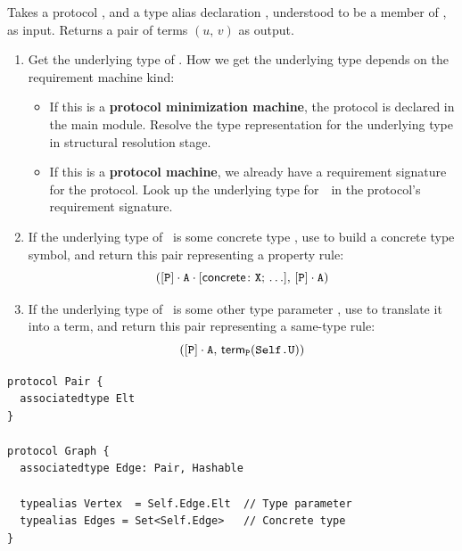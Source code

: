 \documentclass[../generics]{subfiles}
\begin{document}
\begin{algorithm}\label{build rule alias}
Takes a protocol \tP, and a type alias declaration \nA, understood to be a member of \tP, as input. Returns a pair of terms $(u,\,v)$ as output.
\begin{enumerate}
\item Get the underlying type of \nA. How we get the underlying type depends on the requirement machine kind:
\begin{itemize}
\item If this is a \textbf{protocol minimization machine}, the protocol is declared in the main module. Resolve the type representation for the underlying type in structural resolution stage.

\item If this is a \textbf{protocol machine}, we already have a requirement signature for the protocol. Look up the underlying type for~\nA\ in the protocol's requirement signature.
\end{itemize}
\item If the underlying type of \nA\ is some concrete type \tX, use  to build a concrete type symbol, and return this pair representing a property rule:
\[([\texttt{P}] \cdot \texttt{A} \cdot [\mathsf{concrete}\colon \texttt{X};\,\ldots],\, [\texttt{P}] \cdot \texttt{A})\]
\item If the underlying type of \nA\ is some other type parameter \SelfU, use  to translate it into a term, and return this pair representing a same-type rule:
\[([\texttt{P}] \cdot \texttt{A},\, \mathsf{term}_{\texttt{P}}(\texttt{Self.U}))\]
\end{enumerate}
\end{algorithm}

\newcommand{\pPair}{\protosym{Pair}}
\newcommand{\pGraph}{\protosym{Graph}}
\newcommand{\nEl}{\texttt{Elt}}
\newcommand{\nEd}{\texttt{Edge}}
\newcommand{\nV}{\texttt{Vertex}}
\newcommand{\nES}{\texttt{Edges}}

\newcommand{\aEl}{\assocsym{Pair}{Elt}}
\newcommand{\aEd}{\assocsym{Graph}{Edge}}

\begin{listing}\label{listing:graph proto}
\begin{Verbatim}
protocol Pair {
  associatedtype Elt
}

protocol Graph {
  associatedtype Edge: Pair, Hashable

  typealias Vertex  = Self.Edge.Elt  // Type parameter
  typealias Edges = Set<Self.Edge>   // Concrete type
}
\end{Verbatim}
\end{listing}
\end{document}
